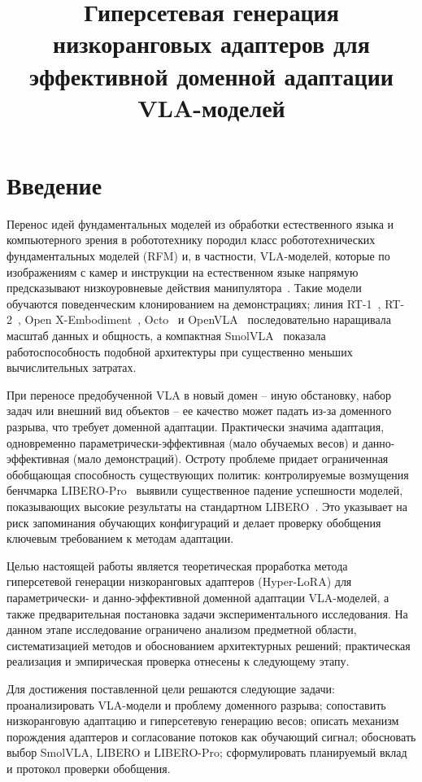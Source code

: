 \documentclass{misisarticle}
\title{Гиперсетевая генерация низкоранговых адаптеров для эффективной доменной адаптации VLA-моделей}
\begin{document}
\maketitle

\section{Введение}

Перенос идей фундаментальных моделей из обработки естественного языка и компьютерного зрения в робототехнику породил класс робототехнических фундаментальных моделей (RFM) и, в частности, VLA-моделей, которые по изображениям с камер и инструкции на естественном языке напрямую предсказывают низкоуровневые действия манипулятора~\cite{firoozi2023}. Такие модели обучаются поведенческим клонированием на демонстрациях; линия RT-1~\cite{rt1}, RT-2~\cite{rt2}, Open X-Embodiment~\cite{oxe}, Octo~\cite{octo} и OpenVLA~\cite{openvla} последовательно наращивала масштаб данных и общность, а компактная SmolVLA~\cite{smolvla} показала работоспособность подобной архитектуры при существенно меньших вычислительных затратах.

При переносе предобученной VLA в новый домен -- иную обстановку, набор задач или внешний вид объектов -- ее качество может падать из-за доменного разрыва, что требует доменной адаптации. Практически значима адаптация, одновременно параметрически-эффективная (мало обучаемых весов) и данно-эффективная (мало демонстраций). Остроту проблеме придает ограниченная обобщающая способность существующих политик: контролируемые возмущения бенчмарка LIBERO-Pro~\cite{liberopro} выявили существенное падение успешности моделей, показывающих высокие результаты на стандартном LIBERO~\cite{libero}. Это указывает на риск запоминания обучающих конфигураций и делает проверку обобщения ключевым требованием к методам адаптации.

Целью настоящей работы является теоретическая проработка метода гиперсетевой генерации низкоранговых адаптеров (Hyper-LoRA) для параметрически- и данно-эффективной доменной адаптации VLA-моделей, а также предварительная постановка задачи экспериментального исследования. На данном этапе исследование ограничено анализом предметной области, систематизацией методов и обоснованием архитектурных решений; практическая реализация и эмпирическая проверка отнесены к следующему этапу.

Для достижения поставленной цели решаются следующие задачи: проанализировать VLA-модели и проблему доменного разрыва; сопоставить низкоранговую адаптацию и гиперсетевую генерацию весов; описать механизм порождения адаптеров и согласование потоков как обучающий сигнал; обосновать выбор SmolVLA, LIBERO и LIBERO-Pro; сформулировать планируемый вклад и протокол проверки обобщения.
\end{document}
